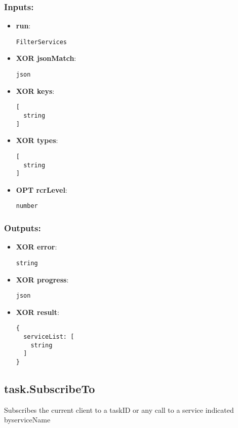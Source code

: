 \subsubsection*{Inputs:}
\begin{itemize}
    \item \textbf{run}: 
\begin{lstlisting}
FilterServices
\end{lstlisting}
    \item \textbf{XOR jsonMatch}: 
\begin{lstlisting}
json
\end{lstlisting}
    \item \textbf{XOR keys}: 
\begin{lstlisting}
[
  string
]
\end{lstlisting}
    \item \textbf{XOR types}: 
\begin{lstlisting}
[
  string
]
\end{lstlisting}
    \item \textbf{OPT rcrLevel}: 
\begin{lstlisting}
number
\end{lstlisting}
  \end{itemize}

\subsubsection*{Outputs:}
\begin{itemize}
    \item \textbf{XOR error}: 
\begin{lstlisting}
string
\end{lstlisting}
    \item \textbf{XOR progress}: 
\begin{lstlisting}
json
\end{lstlisting}
    \item \textbf{XOR result}: 
\begin{lstlisting}
{
  serviceList: [
    string
  ]
}
\end{lstlisting}
  \end{itemize}

\subsection{task.SubscribeTo}
\label{ch:builtinservices:task.SubscribeTo}
Subscribes the current client to a taskID or any call to a service indicated byserviceName
